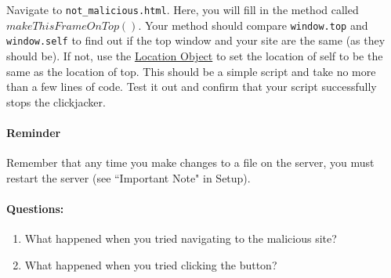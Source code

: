 Navigate to \texttt{not\_malicious.html}. Here, you will fill in the method called $makeThisFrameOnTop()$. Your method should compare \texttt{window.top} and \texttt{window.self} to find out if the top window and your site are the same (as they should be). If not, use the \href{https://developer.mozilla.org/en-US/docs/Web/API/Location}{Location Object} to set the location of self to be the same as the location of top. This should be a simple script and take no more than a few lines of code. Test it out and confirm that your script successfully stops the clickjacker. 

\paragraph{Reminder} Remember that any time you make changes to a file on the server, you must restart the server (see ``Important Note" in Setup). 





\paragraph{Questions:}
\begin{enumerate}
    \item What happened when you tried navigating to the malicious site?
    \item What happened when you tried clicking the button?
\end{enumerate}




